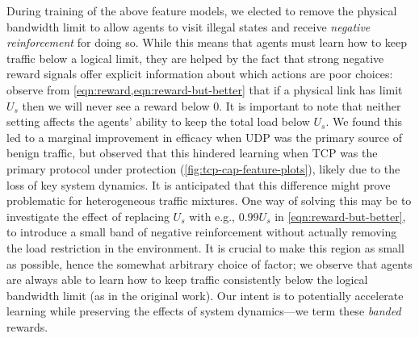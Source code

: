 \documentclass[conference, letterpaper, 10pt, times]{IEEEtran}
\begin{document}
During training of the above feature models, we elected to remove the physical bandwidth limit to allow agents to visit illegal states and receive \emph{negative reinforcement} for doing so.
While this means that agents must learn how to keep traffic below a logical limit, they are helped by the fact that strong negative reward signals offer explicit information about which actions are poor choices: observe from \cref{eqn:reward,eqn:reward-but-better} that if a physical link has limit $U_s$ then we will never see a reward below 0.
It is important to note that neither setting affects the agents' ability to keep the total load below $U_s$.
We found this led to a marginal improvement in efficacy when UDP was the primary source of benign traffic, but observed that this hindered learning when TCP was the primary protocol under protection (\cref{fig:tcp-cap-feature-plots}), likely due to the loss of key system dynamics.
It is anticipated that this difference might prove problematic for heterogeneous traffic mixtures.
One way of solving this may be to investigate the effect of replacing $U_s$ with e.g., $0.99 U_s$ in \cref{eqn:reward-but-better}, to introduce a small band of negative reinforcement without actually removing the load restriction in the environment.
It is crucial to make this region as small as possible, hence the somewhat arbitrary choice of factor; we observe that agents are always able to learn how to keep traffic consistently below the logical bandwidth limit (as in the original work).
Our intent is to potentially accelerate learning while preserving the effects of system dynamics---we term these \emph{banded} rewards.


\end{document}
